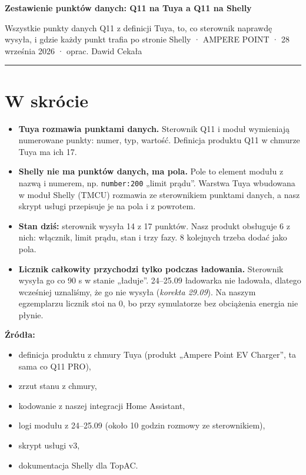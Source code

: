 \documentclass[11pt,a4paper]{article}
\begin{document}
{\LARGE\bfseries Zestawienie punktów danych: Q11 na Tuya a Q11 na Shelly\par}
{\large Wszystkie punkty danych Q11 z definicji Tuya, to, co sterownik naprawdę wysyła, i gdzie każdy punkt trafia po stronie Shelly · AMPERE POINT · 28 września 2026 · oprac. Dawid Cekała\par}
\vspace{4pt}\textcolor{apteal}{\rule{\textwidth}{1.2pt}}

\section*{W skrócie}

\begin{itemize}
\item \textbf{Tuya rozmawia punktami danych.} Sterownik Q11 i moduł wymieniają numerowane punkty: numer, typ, wartość. Definicja produktu Q11 w chmurze Tuya ma ich 17.
\item \textbf{Shelly nie ma punktów danych, ma pola.} Pole to element modułu z nazwą i numerem, np. \texttt{number:200} „limit prądu”. Warstwa Tuya wbudowana w moduł Shelly (TMCU) rozmawia ze sterownikiem punktami danych, a nasz skrypt usługi przepisuje je na pola i z powrotem.
\item \textbf{Stan dziś:} sterownik wysyła 14 z 17 punktów. Nasz produkt obsługuje 6 z nich: włącznik, limit prądu, stan i trzy fazy. 8 kolejnych trzeba dodać jako pola.
\item \textbf{Licznik całkowity przychodzi tylko podczas ładowania.} Sterownik wysyła go co 90 s w stanie „ładuje”. 24–25.09 ładowarka nie ładowała, dlatego wcześniej uznaliśmy, że go nie wysyła (\emph{korekta 29.09}). Na naszym egzemplarzu licznik stoi na 0, bo przy symulatorze bez obciążenia energia nie płynie.
\end{itemize}

\textbf{Źródła:}

\begin{itemize}
\item definicja produktu z chmury Tuya (produkt „Ampere Point EV Charger”, ta sama co Q11 PRO),
\item zrzut stanu z chmury,
\item kodowanie z naszej integracji Home Assistant,
\item logi modułu z 24–25.09 (około 10 godzin rozmowy ze sterownikiem),
\item skrypt usługi v3,
\item dokumentacja Shelly dla TopAC.
\end{itemize}
\end{document}
